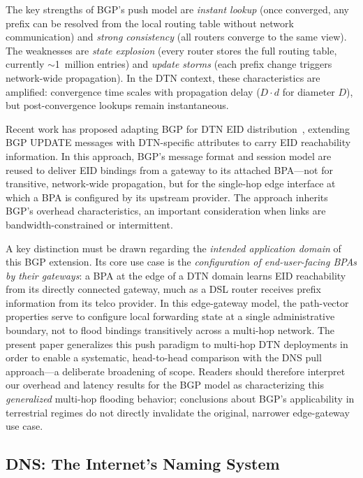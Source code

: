 \documentclass[journal,twocolumn]{IEEEtran}
\begin{document}
The key strengths of BGP's push model are \emph{instant lookup} (once converged, any prefix can be resolved from the local routing table without network communication) and \emph{strong consistency} (all routers converge to the same view). 
The weaknesses are \emph{state explosion} (every router stores the full routing table, currently $\sim$1~million entries) and \emph{update storms} (each prefix change triggers network-wide propagation). 
In the DTN context, these characteristics are amplified: convergence time scales with propagation delay ($D \cdot d$ for diameter $D$), but post-convergence lookups remain instantaneous.

Recent work has proposed adapting BGP for DTN EID distribution~\cite{feldmann2025bgp}, extending BGP UPDATE messages with DTN-specific attributes to carry EID reachability information.
In this approach, BGP's message format and session model are reused to deliver EID bindings from a gateway to its attached BPA---not for transitive, network-wide propagation, but for the single-hop edge interface at which a BPA is configured by its upstream provider.
The approach inherits BGP's overhead characteristics, an important consideration when links are bandwidth-constrained or intermittent.

A key distinction must be drawn regarding the \emph{intended application domain} of this BGP extension.
Its core use case is the \emph{configuration of end-user-facing BPAs by their gateways}: a BPA at the edge of a DTN domain learns EID reachability from its directly connected gateway, much as a DSL router receives prefix information from its telco provider.
In this edge-gateway model, the path-vector properties serve to configure local forwarding state at a single administrative boundary, not to flood bindings transitively across a multi-hop network.
The present paper generalizes this push paradigm to multi-hop DTN deployments in order to enable a systematic, head-to-head comparison with the DNS pull approach---a deliberate broadening of scope.
Readers should therefore interpret our overhead and latency results for the BGP model as characterizing this \emph{generalized} multi-hop flooding behavior; conclusions about BGP's applicability in terrestrial regimes do not directly invalidate the original, narrower edge-gateway use case.

\subsection{DNS: The Internet's Naming System}
\label{sec_dns_background}
\end{document}
